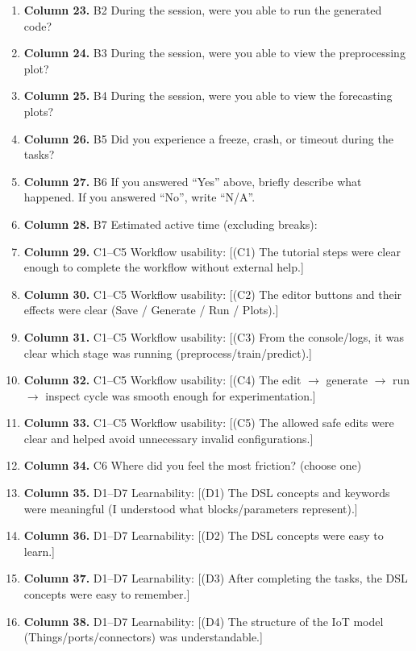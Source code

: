 \begin{enumerate}[leftmargin=*]
    \item \textbf{Column 23.} B2 During the session, were you able to run the generated code?
    \item \textbf{Column 24.} B3 During the session, were you able to view the preprocessing plot?
    \item \textbf{Column 25.} B4 During the session, were you able to view the forecasting plots?
    \item \textbf{Column 26.} B5 Did you experience a freeze, crash, or timeout during the tasks?
    \item \textbf{Column 27.} B6 If you answered ``Yes'' above, briefly describe what happened. If you answered ``No'', write ``N/A''.
    \item \textbf{Column 28.} B7 Estimated active time (excluding breaks):
    \item \textbf{Column 29.} C1--C5 Workflow usability: [(C1) The tutorial steps were clear enough to complete the workflow without external help.]
    \item \textbf{Column 30.} C1--C5 Workflow usability: [(C2) The editor buttons and their effects were clear (Save / Generate / Run / Plots).]
    \item \textbf{Column 31.} C1--C5 Workflow usability: [(C3) From the console/logs, it was clear which stage was running (preprocess/train/predict).]
    \item \textbf{Column 32.} C1--C5 Workflow usability: [(C4) The edit \(\rightarrow\) generate \(\rightarrow\) run \(\rightarrow\) inspect cycle was smooth enough for experimentation.]
    \item \textbf{Column 33.} C1--C5 Workflow usability: [(C5) The allowed safe edits were clear and helped avoid unnecessary invalid configurations.]
    \item \textbf{Column 34.} C6 Where did you feel the most friction? (choose one)
    \item \textbf{Column 35.} D1--D7 Learnability: [(D1) The DSL concepts and keywords were meaningful (I understood what blocks/parameters represent).]
    \item \textbf{Column 36.} D1--D7 Learnability: [(D2) The DSL concepts were easy to learn.]
    \item \textbf{Column 37.} D1--D7 Learnability: [(D3) After completing the tasks, the DSL concepts were easy to remember.]
    \item \textbf{Column 38.} D1--D7 Learnability: [(D4) The structure of the IoT model (Things/ports/connectors) was understandable.]

\end{enumerate}
